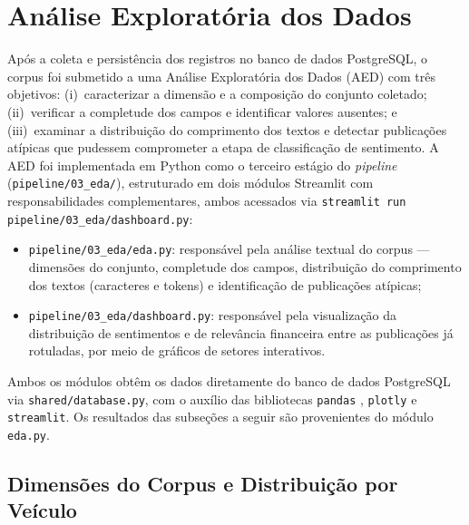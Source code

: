 
\section{Análise Exploratória dos Dados}
\label{sec:eda}

Após a coleta e persistência dos registros no banco de dados PostgreSQL, o corpus foi submetido a uma Análise Exploratória dos Dados (AED) com três objetivos: (i)~caracterizar a dimensão e a composição do conjunto coletado; (ii)~verificar a completude dos campos e identificar valores ausentes; e (iii)~examinar a distribuição do comprimento dos textos e detectar publicações atípicas que pudessem comprometer a etapa de classificação de sentimento. A AED foi implementada em Python como o terceiro estágio do \textit{pipeline} (\texttt{pipeline/03\_eda/}), estruturado em dois módulos Streamlit com responsabilidades complementares, ambos acessados via \texttt{streamlit run pipeline/03\_eda/dashboard.py}:

\begin{itemize}
	\item \texttt{pipeline/03\_eda/eda.py}: responsável pela análise textual do corpus — dimensões do conjunto, completude dos campos, distribuição do comprimento dos textos (caracteres e tokens) e
	identificação de publicações atípicas;
	
	\item \texttt{pipeline/03\_eda/dashboard.py}: responsável pela visualização da distribuição de sentimentos e de relevância financeira entre as publicações já rotuladas, por meio de gráficos de setores interativos.
\end{itemize}

Ambos os módulos obtêm os dados diretamente do banco de dados PostgreSQL via \texttt{shared/database.py}, com o auxílio das bibliotecas \texttt{pandas} \cite{pandas2020}, \texttt{plotly} e \texttt{streamlit}. Os resultados das subseções a seguir são provenientes do módulo \texttt{eda.py}.


\subsection{Dimensões do Corpus e Distribuição por Veículo}
\label{subsec:dimensoes}

